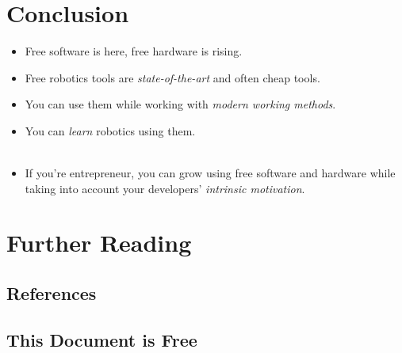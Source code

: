 \section*{Conclusion}

  \begin{frame}{\insertsection}
    \begin{itemize}
      \item Free software is here, free \alert{hardware} is rising.
      \item Free robotics tools are \emph{state-of-the-art} and often cheap tools.
      \item You can use them while working with \emph{modern working methods}.
      \item You can \emph{learn} robotics using them.\\~\\
      \item If you're entrepreneur, you can grow using free software and hardware while taking into account your developers' \emph{intrinsic motivation}.
    \end{itemize}
  \end{frame}

\appendix

\section{Further Reading}

%
\subsection{References}

  \begin{frame}{\insertsubsection}
    {}
    
    \nocite{pilgrim2004dive}
  \end{frame}

%
\subsection{This Document is Free}



